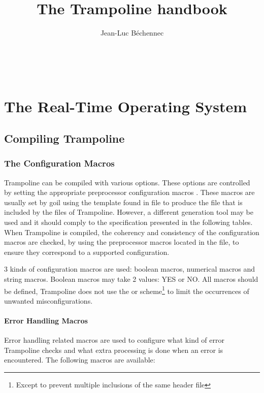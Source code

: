 \documentclass[11pt]{manual}
\title{The Trampoline handbook}
\author{Jean-Luc B\'echennec}
\begin{document}
\maketitle
~\newpage
\setcounter{tocdepth}{2}
\tableofcontents

\part{The Real-Time Operating System}

\chapter{Compiling Trampoline}

\section{The Configuration Macros}

Trampoline can be compiled with various options. These options are controlled by setting the appropriate preprocessor configuration macros%
.
These macros are usually set by goil%
using the template found in  file to produce the  file that is included by the files of Trampoline. However, a different generation tool may be used and it should comply to the specification presented in the following tables. When Trampoline is compiled, the coherency and consistency of the configuration macros are checked, by using the preprocessor macros located in the  file, to ensure they correspond to a supported configuration.

3 kinds of configuration macros are used: boolean macros, numerical macros and string macros. Boolean macros may take 2 values: YES or NO. All macros should be defined, Trampoline does not use the  or  scheme\footnote{Except to prevent multiple inclusions of the same header file} to limit the occurrences of unwanted misconfigurations.

\subsection{Error Handling Macros}

Error handling related macros are used to configure what kind of error Trampoline checks and what extra processing is done when an error is encountered. The following macros are available:
\end{document}
